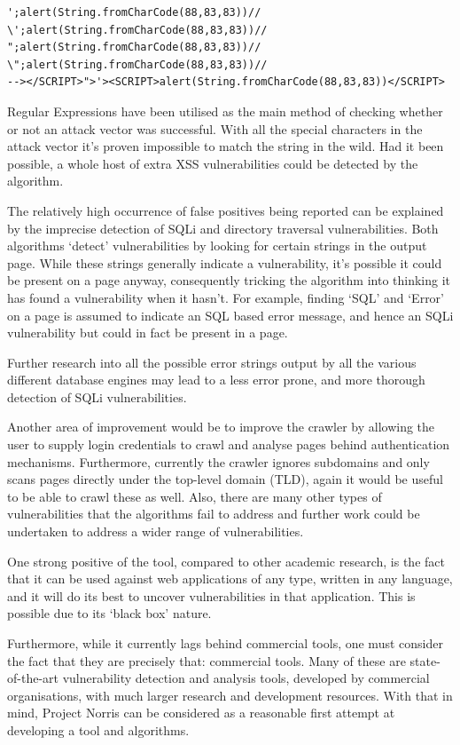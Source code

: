 \documentclass[12pt,a4paper]{article}
\begin{document}
\begin{lstlisting}
';alert(String.fromCharCode(88,83,83))//
\';alert(String.fromCharCode(88,83,83))//
";alert(String.fromCharCode(88,83,83))//
\";alert(String.fromCharCode(88,83,83))//
--></SCRIPT>">'><SCRIPT>alert(String.fromCharCode(88,83,83))</SCRIPT>
\end{lstlisting}

Regular Expressions have been utilised as the main method of checking whether or not an attack vector was successful. With all the special characters in the attack vector it's proven impossible to match the string in the wild.  Had it been possible, a whole host of extra XSS vulnerabilities could be detected by the algorithm.

The relatively high occurrence of false positives being reported can be explained by the imprecise detection of SQLi and directory traversal vulnerabilities.  Both algorithms `detect' vulnerabilities by looking for certain strings in the output page.  While these strings generally indicate a vulnerability, it's possible it could be present on a page anyway, consequently tricking the algorithm into thinking it has found a vulnerability when it hasn't.  For example, finding `SQL' and `Error' on a page is assumed to indicate an SQL based error message, and hence an SQLi vulnerability but could in fact be present in a page.

Further research into all the possible error strings output by all the various different database engines may lead to a less error prone, and more thorough detection of SQLi vulnerabilities.

Another area of improvement would be to improve the crawler by allowing the user to supply login credentials to crawl and analyse pages behind authentication mechanisms. Furthermore, currently the crawler ignores subdomains and only scans pages directly under the top-level domain (TLD), again it would be useful to be able to crawl these as well.  Also, there are many other types of vulnerabilities that the algorithms fail to address and further work could be undertaken to address a wider range of vulnerabilities.

One strong positive of the tool, compared to other academic research, is the fact that it can be used against web applications of any type, written in any language, and it will do its best to uncover vulnerabilities in that application.  This is possible due to its `black box' nature.

Furthermore, while it currently lags behind commercial tools, one must consider the fact that they are precisely that: commercial tools.  Many of these are state-of-the-art vulnerability detection and analysis tools, developed by commercial organisations, with much larger research and development resources.  With that in mind, Project Norris can be considered as a reasonable first attempt at developing a tool and algorithms.
\end{document}
